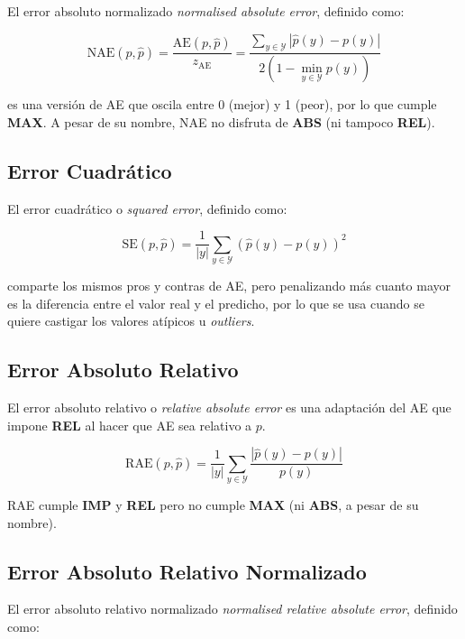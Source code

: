 El error absoluto normalizado {\it normalised absolute error}, definido como:

\begin{equation}
    {\text{NAE}(p, \hat p)} = \frac{\text{AE}(p, \hat p)}{z_{\text{AE}}} = \frac{\sum _{y\in {\mathcal {Y}}}{|\hat p(y) - p(y)|}}{2(1-\displaystyle \min_{y\in {\mathcal {Y}}}p(y))}
\end{equation}

es una versión de AE que oscila entre 0 (mejor) y 1 (peor), por lo que cumple
{\bf MAX}. A pesar de su nombre, NAE no disfruta de {\bf ABS} (ni tampoco {\bf
REL}).

\subsection{Error Cuadrático}

El error cuadrático o {\it squared error}, definido como:

\begin{equation}
    {\text{SE}(p, \hat p)} = \frac{1}{|y|}\sum _{y\in {\mathcal {Y}}}{{(\hat p(y) - p(y))}^2}
\end{equation}

comparte los mismos pros y contras de AE, pero penalizando más cuanto mayor es
la diferencia entre el valor real y el predicho, por lo que se usa cuando se
quiere castigar los valores atípicos u {\it outliers}.

\subsection{Error Absoluto Relativo}

El error absoluto relativo o {\it relative absolute error\/} es una adaptación
del AE que impone {\bf REL} al hacer que AE sea relativo a $p$.

\begin{equation}
    {\text{RAE}(p, \hat p)} = \frac{1}{|y|}\sum _{y\in {\mathcal {Y}}}{\frac{|\hat p(y) - p(y)|}{p(y)}}
\end{equation}

RAE cumple {\bf IMP} y {\bf REL} pero no cumple {\bf MAX} (ni {\bf ABS}, a pesar
de su nombre).

\subsection{Error Absoluto Relativo Normalizado}

El error absoluto relativo normalizado {\it normalised relative absolute error},
definido como:

